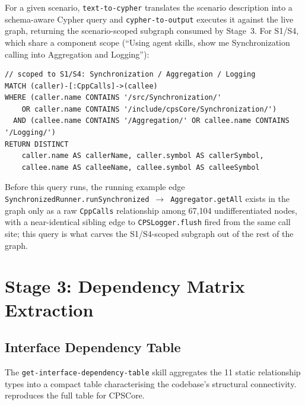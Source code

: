 For a given scenario, \texttt{text-to-cypher} translates the scenario
description into a schema-aware Cypher query and \texttt{cypher-to-output}
executes it against the live graph, returning the scenario-scoped
subgraph consumed by Stage~3. For S1/S4, which share a component scope
(``Using agent skills, show me Synchronization calling into Aggregation
and Logging''):

\begin{verbatim}
// scoped to S1/S4: Synchronization / Aggregation / Logging
MATCH (caller)-[:CppCalls]->(callee)
WHERE (caller.name CONTAINS '/src/Synchronization/'
    OR caller.name CONTAINS '/include/cpsCore/Synchronization/')
  AND (callee.name CONTAINS '/Aggregation/' OR callee.name CONTAINS '/Logging/')
RETURN DISTINCT
    caller.name AS callerName, caller.symbol AS callerSymbol,
    callee.name AS calleeName, callee.symbol AS calleeSymbol
\end{verbatim}

Before this query runs, the running example edge
\texttt{SynchronizedRunner.runSynchronized}~$\to$~\texttt{Aggregator.getAll}
exists in the graph only as a raw \texttt{CppCalls} relationship among
67,104 undifferentiated nodes, with a near-identical sibling edge to
\texttt{CPSLogger.flush} fired from the same call site; this query is
what carves the S1/S4-scoped subgraph out of the rest of the graph.

\section{Stage 3: Dependency Matrix Extraction}\label{sec:matrix-impl}

\subsection{Interface Dependency Table}\label{sec:idt}

The \texttt{get-interface-dependency-table} skill aggregates the 11
static relationship types into a compact table characterising the
codebase's structural connectivity.  reproduces the full
table for CPSCore.

